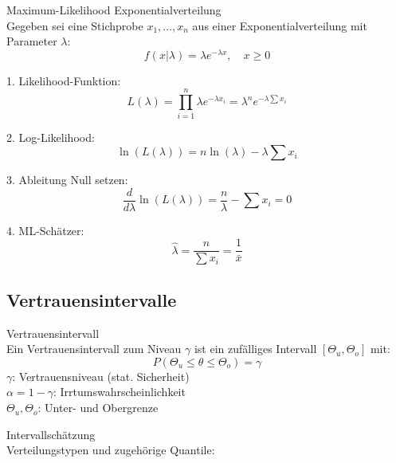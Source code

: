 \begin{example2}{Maximum-Likelihood Exponentialverteilung}\\
Gegeben sei eine Stichprobe $x_1,...,x_n$ aus einer Exponentialverteilung mit Parameter $\lambda$:
$$f(x|\lambda) = \lambda e^{-\lambda x}, \quad x \geq 0$$

1. Likelihood-Funktion:
$$L(\lambda) = \prod_{i=1}^n \lambda e^{-\lambda x_i} = \lambda^n e^{-\lambda \sum x_i}$$

2. Log-Likelihood:
$$\ln(L(\lambda)) = n\ln(\lambda) - \lambda \sum x_i$$

3. Ableitung Null setzen:
$$\frac{d}{d\lambda}\ln(L(\lambda)) = \frac{n}{\lambda} - \sum x_i = 0$$

4. ML-Schätzer:
$$\hat{\lambda} = \frac{n}{\sum x_i} = \frac{1}{\bar{x}}$$
\end{example2}

\subsection{Vertrauensintervalle}

\begin{definition}{Vertrauensintervall}\\
Ein Vertrauensintervall zum Niveau $\gamma$ ist ein zufälliges Intervall $[\Theta_u,\Theta_o]$ mit:
$$
P(\Theta_u \leq \theta \leq \Theta_o)=\gamma
$$
$\gamma$: Vertrauensniveau (stat. Sicherheit)\\
$\alpha=1-\gamma$: Irrtumswahrscheinlichkeit\\
$\Theta_u, \Theta_o$: Unter- und Obergrenze
\end{definition}

\begin{concept}{Intervallschätzung}\\
Verteilungstypen und zugehörige Quantile:
\begin{center}
\end{center}
\end{concept}

